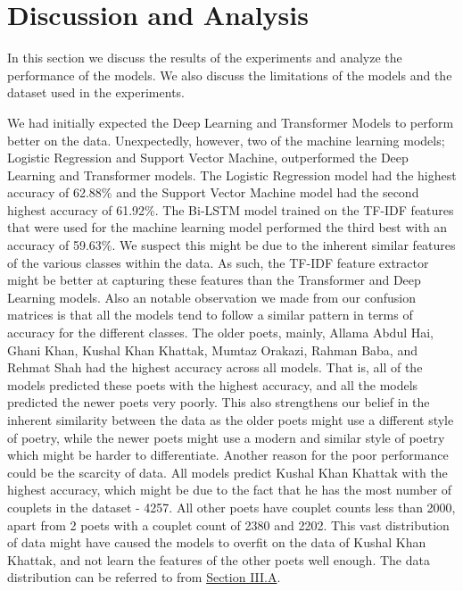 \section{Discussion and Analysis}
In this section we discuss the results of the experiments and analyze the performance of the models. We also discuss the limitations of the models and the dataset used in the experiments.

We had initially expected the Deep Learning and Transformer Models to perform better on the data. Unexpectedly, however, two of the machine learning models; Logistic Regression and Support Vector Machine, outperformed the Deep Learning and Transformer models. The Logistic Regression model had the highest accuracy of 62.88\% and the Support Vector Machine model had the second highest accuracy of 61.92\%. The Bi-LSTM model trained on the TF-IDF features that were used for the machine learning model performed the third best with an accuracy of 59.63\%. We suspect this might be due to the inherent similar features of the various classes within the data. As such, the TF-IDF feature extractor might be better at capturing these features than the Transformer and Deep Learning models. Also an notable observation we made from our confusion matrices is that all the models tend to follow a similar pattern in terms of accuracy for the different classes. The older poets, mainly, Allama Abdul Hai, Ghani Khan, Kushal Khan Khattak, Mumtaz Orakazi, Rahman Baba, and Rehmat Shah had the highest accuracy across all models. That is, all of the models predicted these poets with the highest accuracy, and all the models predicted the newer poets very poorly. This also strengthens our belief in the inherent similarity between the data as the older poets might use a different style of poetry, while the newer poets might use a modern and similar style of poetry which might be harder to differentiate. Another reason for the poor performance could be the scarcity of data. All models predict Kushal Khan Khattak with the highest accuracy, which might be due to the fact that he has the most number of couplets in the dataset - 4257. All other poets have couplet counts less than 2000, apart from 2 poets with a couplet count of 2380 and 2202. This vast distribution of data might have caused the models to overfit on the data of Kushal Khan Khattak, and not learn the features of the other poets well enough. The data distribution can be referred to from \hyperref[fig:poet-dist-hist]{Section III.A}. 
